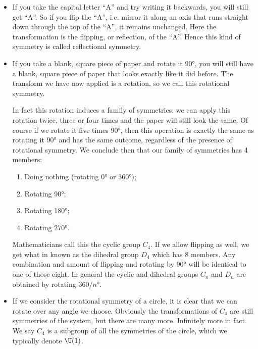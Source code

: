 \begin{itemize}
\item If you take the capital letter ``A'' and try writing it backwards, you will still get ``A''. So if you flip the ``A'', i.e. mirror it along an axis that runs straight down through the top of the ``A'', it remains unchanged. Here the transformation is the flipping, or reflection, of the ``A''. Hence this kind of symmetry is called reflectional symmetry.
\item If you take a blank, square piece of paper and rotate it \ang{90}, you will still have a blank, square piece of paper that looks exactly like it did before. The transform we have now applied is a rotation, so we call this rotational symmetry.

In fact this rotation induces a family of symmetries: we can apply this rotation twice, three or four times and the paper will still look the same. Of course if we rotate it five times \ang{90}, then this operation is exactly the same as rotating it \ang{90} and has the same outcome, regardless of the presence of rotational symmetry. We conclude then that our family of symmetries has 4 members:
\begin{enumerate}
\item Doing nothing (rotating \ang{0} or \ang{360});
\item Rotating \ang{90};
\item Rotating \ang{180};
\item Rotating \ang{270}.
\end{enumerate}
Mathematicians call this the cyclic group $C_4$. If we allow flipping as well, we get what in known as the dihedral group $D_4$ which has 8 members. Any combination and amount of flipping and rotating by \ang{90} will be identical to one of those eight. In general the cyclic and dihedral groups $C_n$ and $D_n$ are obtained by rotating $360/n\si{\degree}$.
\item If we consider the rotational symmetry of a circle, it is clear that we can rotate over any angle we choose. Obviously the transformations of $C_4$ are still symmetries of the system, but there are many more. Infinitely more in fact. We say $C_4$ is a subgroup of all the symmetries of the circle, which we typically denote $\U(1)$.


\end{itemize}
